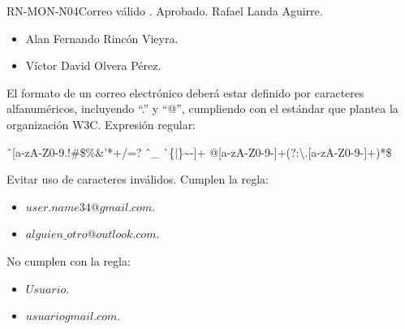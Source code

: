 %
\begin{BusinessRule}{RN-MON-N04}{Correo válido}
	{\bcIntegridad}
	{\btEnabler}
	{\blControlling}
	.
	\BRItem[Estado] Aprobado.
	 Rafael Landa Aguirre.
	 \cdtEmpty
	\begin{itemize}
		\item Alan Fernando Rincón Vieyra.
		\item Víctor David Olvera Pérez.
	\end{itemize}
	\BRItem[Descripción] El formato de un correo electrónico deberá estar 
	definido por caracteres alfanuméricos, incluyendo “.” y “@”, cumpliendo 
	con el estándar que plantea la organización W3C.
	\BRItem[Sentencia] Expresión regular:
	\begin{center}
		\^ \ [a-zA-Z0-9.!\#\$\%\&'*+/=? \^ \ \_ \` \ \{$|$\}\textasciitilde-]+
		@[a-zA-Z0-9-]+(?:\textbackslash .[a-zA-Z0-9-]+)*\$
	\end{center}
	\BRItem[Motivación] Evitar uso de caracteres inválidos.
	 Cumplen la regla:
	\begin{itemize}
		\item $user.name34@gmail.com$.
		\item $alguien\_otro@outlook.com$.
	\end{itemize}
	 No cumplen con la regla:
	\begin{itemize}
		\item $Usuario$.
		\item $usuariogmail.com$.
	\end{itemize}
\end{BusinessRule}

